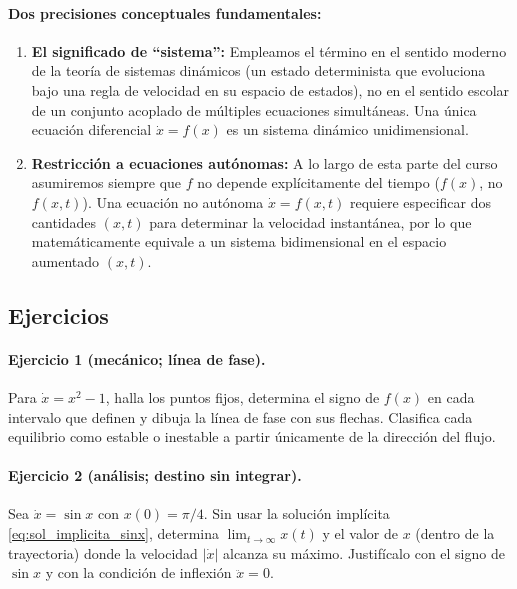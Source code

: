 \paragraph{Dos precisiones conceptuales fundamentales:}
\begin{enumerate}
    \item \textbf{El significado de ``sistema'':} Empleamos el término en el sentido moderno de la teoría de sistemas dinámicos (un estado determinista que evoluciona bajo una regla de velocidad en su espacio de estados), no en el sentido escolar de un conjunto acoplado de múltiples ecuaciones simultáneas. Una única ecuación diferencial $\dot{x} = f(x)$ es un sistema dinámico unidimensional.
    \item \textbf{Restricción a ecuaciones autónomas:} A lo largo de esta parte del curso asumiremos siempre que $f$ no depende explícitamente del tiempo ($f(x)$, no $f(x, t)$). Una ecuación no autónoma $\dot{x} = f(x, t)$ requiere especificar dos cantidades $(x, t)$ para determinar la velocidad instantánea, por lo que matemáticamente equivale a un sistema bidimensional en el espacio aumentado $(x, t)$.
\end{enumerate}

\subsection{Ejercicios}

\paragraph{Ejercicio 1 (mecánico; línea de fase).} Para $\dot{x} = x^2 - 1$, halla los puntos fijos, determina el signo de $f(x)$ en cada intervalo que definen y dibuja la línea de fase con sus flechas. Clasifica cada equilibrio como estable o inestable a partir únicamente de la dirección del flujo.

\paragraph{Ejercicio 2 (análisis; destino sin integrar).} Sea $\dot{x} = \sin x$ con $x(0) = \pi/4$. Sin usar la solución implícita \eqref{eq:sol_implicita_sinx}, determina $\lim_{t\to\infty} x(t)$ y el valor de $x$ (dentro de la trayectoria) donde la velocidad $|\dot x|$ alcanza su máximo. Justifícalo con el signo de $\sin x$ y con la condición de inflexión $\ddot x=0$.


